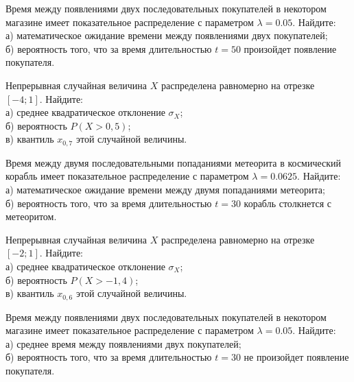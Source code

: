 \vfill

\z Время между появлениями двух последовательных покупателей в некотором магазине имеет показательное распределение с параметром $\lambda = 0.05$. Найдите: \\ \quad а) математическое ожидание времени между появлениями двух покупателей; \\ \quad б) вероятность того, что за время длительностью $t = 50$  произойдет появление покупателя.
 

\vfill

\newpage\setcounter{zad}{0}

\z Непрерывная случайная величина $X$ распределена равномерно на отрезке $[-4; 1]$. Найдите: \\ \quad а) среднее квадратическое отклонение $\sigma_X$; \\ \quad б) вероятность $P(X>0{,}5)$; \\ \quad в) квантиль $x_{0{,}7}$ этой случайной величины.


\vfill

\z Время между двумя последовательными попаданиями метеорита в космический корабль имеет показательное распределение с параметром $\lambda = 0.0625$. Найдите: \\ \quad а) математическое ожидание времени между двумя попаданиями метеорита; \\ \quad б) вероятность того, что за время длительностью $t = 30$ корабль  столкнется с метеоритом.
 

\vfill

\newpage\setcounter{zad}{0}

\z Непрерывная случайная величина $X$ распределена равномерно на отрезке $[-2; 1]$. Найдите: \\ \quad а) среднее квадратическое отклонение $\sigma_X$; \\ \quad б) вероятность $P(X>-1{,}4)$; \\ \quad в) квантиль $x_{0{,}6}$ этой случайной величины.


\vfill

\z Время между появлениями двух последовательных покупателей в некотором магазине имеет показательное распределение с параметром $\lambda = 0.05$. Найдите: \\ \quad а) среднее время между появлениями двух покупателей; \\ \quad б) вероятность того, что за время длительностью $t = 30$ не произойдет появление покупателя.
 

\vfill

